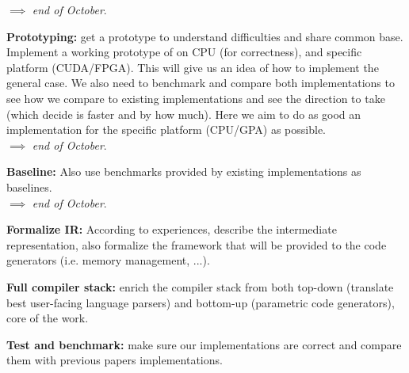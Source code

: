 $\implies$ \emph{end of October}.

\item \textbf{Prototyping:} get a prototype to understand difficulties and share common base. \\ Implement a working prototype of  on CPU (for correctness), and specific platform (CUDA/FPGA). This will give us an idea of how to implement the general case. We also need to benchmark and compare both implementations to see how we compare to existing implementations and see the direction to take (which decide is faster and by how much). Here we aim to do as good an implementation for the specific platform (CPU/GPA) as possible.\\
$\implies$ \emph{end of October}.

\item \textbf{Baseline:} Also use benchmarks provided by existing implementations as baselines.\\
$\implies$ \emph{end of October}.

\item \textbf{Formalize IR:} According to experiences, describe the intermediate representation, also formalize the framework that will be provided to the code generators (i.e. memory management, ...).
\item \textbf{Full compiler stack:} enrich the compiler stack from both top-down (translate best user-facing language parsers) and bottom-up (parametric code generators), core of the work.
\item \textbf{Test and benchmark:} make sure our implementations are correct and compare them with previous papers implementations.
\ole








